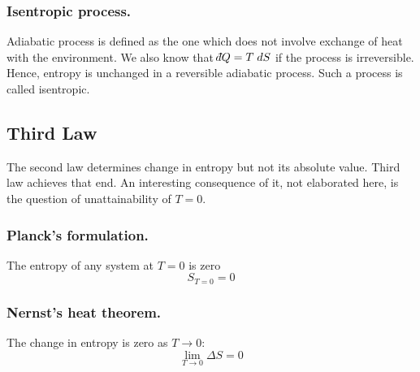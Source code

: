 \documentclass[../../../Main.tex]{subfiles}
\begin{document}
\subsubsection{Isentropic process.} Adiabatic process is defined as the one which does not involve exchange of heat with the environment. We also know that $\dbar Q= T\; d S$ if the process is irreversible. Hence, entropy is unchanged in a reversible adiabatic process. Such a process is called isentropic. 

\subsection{Third Law}
The second law determines change in entropy but not its absolute value. Third law achieves that end. An interesting consequence of it, not elaborated here, is the question of unattainability of $T = 0$.

\subsubsection{Planck’s formulation.} The entropy of any system at $T = 0$ is zero
\begin{equation*}
    S_{T=0}=0
\end{equation*}

\subsubsection{Nernst’s heat theorem.} The change in entropy is zero as $T \rightarrow 0$:
\begin{equation*}
    \lim_{T\rightarrow0}\Delta S=0
\end{equation*}
\end{document}
